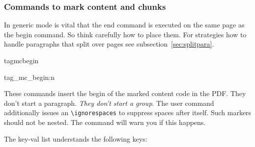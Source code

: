 \documentclass[DIV=12,parskip=half-,bibliography=totoc]{scrartcl}
\newcommand\PDF{PDF}
\begin{document}
\subsubsection{Commands to mark content and chunks}


In generic mode is vital that the end command is executed on the same page as the begin command. So think carefully how to place them.
For strategies how to handle paragraphs that split over pages see subsection~\ref{sec:splitpara}.

\begin{docCommand}{tagmcbegin}{}\end{docCommand}
\begin{docCommand}{tag_mc_begin:n}{}\end{docCommand}


These commands insert the begin of the marked content code in the \PDF{}. They don't start a paragraph. \emph{They don't start a group}. The user command additionally issues an \verb+\ignorespaces+ to suppress spaces after itself.
Such markers should not be nested. The command will warn you if this happens.

The key-val list understands the following keys:
\end{document}
